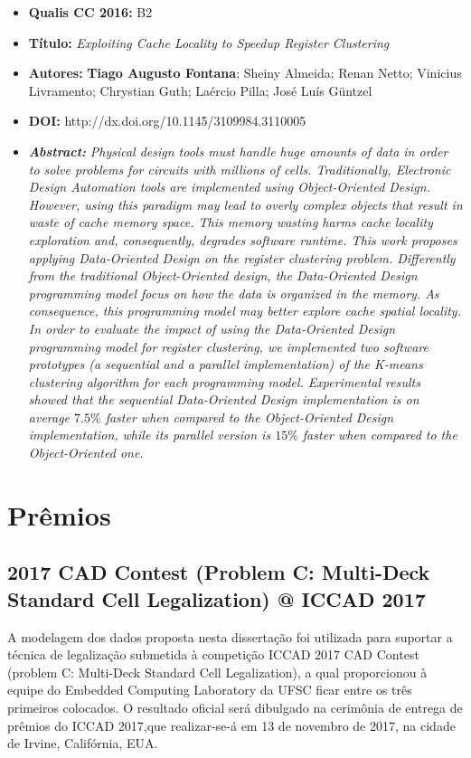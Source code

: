 \begin{itemize}
\item \textbf{Qualis CC 2016:} B2
\item \textbf{Título:} \textit{Exploiting Cache Locality to Speedup Register Clustering}
\item \textbf{Autores:}  \textbf{Tiago Augusto Fontana}; Sheiny Almeida; Renan Netto; Vinicius Livramento; Chrystian Guth;  Laércio Pilla; José Luís Güntzel
\item \textbf{DOI:} http://dx.doi.org/10.1145/3109984.3110005
\item \textbf{\textit{Abstract:}} \emph{Physical design tools must handle huge amounts of data in order to solve problems for circuits with millions of cells. Traditionally, Electronic Design Automation tools are implemented using Object-Oriented Design. However, using this paradigm may lead to overly complex objects that result in waste of cache memory space. This memory wasting harms cache locality exploration and, consequently, degrades software runtime. This work proposes applying Data-Oriented Design on the register clustering problem. Differently from the traditional Object-Oriented design, the Data-Oriented Design programming model focus on how the data is organized in the memory. As consequence, this programming model may better explore cache spatial locality. In order to evaluate the impact of using the Data-Oriented Design programming model for register clustering, we implemented two software prototypes (a sequential and a parallel implementation) of the K-means clustering algorithm for each programming model. Experimental results showed that the sequential Data-Oriented Design implementation is on average $7.5\%$ faster when compared to the Object-Oriented Design implementation, while its parallel version is $15\%$ faster when compared to the Object-Oriented one.}
\end{itemize}

\section{Prêmios}
\subsection{2017 CAD Contest (Problem C: Multi-Deck Standard Cell Legalization) @ ICCAD 2017}

A modelagem dos dados proposta nesta dissertação foi utilizada para suportar a técnica de legalização submetida à competição ICCAD 2017 CAD Contest (problem C: Multi-Deck Standard Cell Legalization), a qual proporcionou à equipe do Embedded Computing Laboratory da UFSC ficar entre os três primeiros colocados.
O resultado oficial será dibulgado na cerimônia de entrega de prêmios do ICCAD 2017,que realizar-se-á em 13 de novembro de 2017, na cidade de Irvine, Califórnia, EUA.

